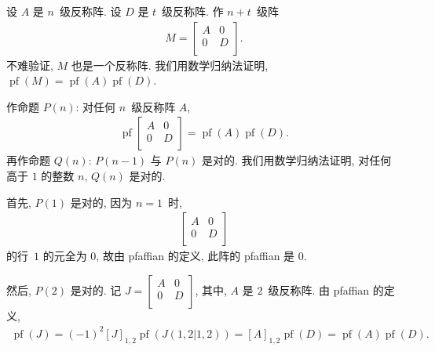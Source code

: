 \documentclass[../libro.tex]{subfiles}
\begin{document}
\begin{example}
    设 \(A\) 是 \(n\)~级反称阵.
    设 \(D\) 是 \(t\)~级反称阵.
    作 \(n + t\)~级阵
    \begin{align*}
        M =
        \begin{bmatrix}
            A & 0 \\
            0 & D \\
        \end{bmatrix}.
    \end{align*}
    不难验证, \(M\) 也是一个反称阵.
    我们用数学归纳法证明, \(\operatorname{pf} {(M)}
    = \operatorname{pf} {(A)} \operatorname{pf} {(D)}\).

    作命题 \(P(n)\):
    对任何 \(n\)~级反称阵 \(A\),
    \begin{align*}
        \operatorname{pf} {
            \begin{bmatrix}
                A & 0 \\
                0 & D \\
            \end{bmatrix}
        } = \operatorname{pf} {(A)} \operatorname{pf} {(D)}.
    \end{align*}
    再作命题 \(Q(n)\):
    \(P(n-1)\) 与 \(P(n)\) 是对的.
    我们用数学归纳法证明,
    对任何高于 \(1\) 的整数 \(n\), \(Q(n)\) 是对的.

    首先, \(P(1)\) 是对的, 因为 \(n = 1\)~时,
    \begin{align*}
        \begin{bmatrix}
            A & 0 \\
            0 & D \\
        \end{bmatrix}
    \end{align*}
    的行~\(1\) 的元全为 \(0\),
    故由 pfaffian 的定义, 此阵的 pfaffian 是 \(0\).

    然后, \(P(2)\) 是对的.
    记 \(J =
        \begin{bmatrix}
            A & 0 \\
            0 & D \\
        \end{bmatrix}
    \),
    其中, \(A\) 是 \(2\)~级反称阵.
    由 pfaffian 的定义,
    \begin{align*}
        \operatorname{pf} {(J)}
        = (-1)^{2} [J]_{1,2} \operatorname{pf} {(J({1,2}|{1,2}))}
        = [A]_{1,2} \operatorname{pf} {(D)}
        = \operatorname{pf} {(A)} \operatorname{pf} {(D)}.
    \end{align*}


\end{example}
\end{document}
